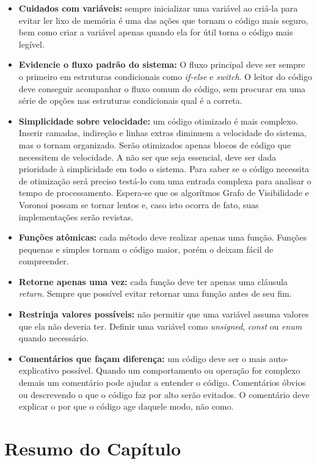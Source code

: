 \begin{itemize}
  \item \textbf{Cuidados com variáveis:} sempre inicializar uma variável ao criá-la para evitar ler lixo de memória é uma das ações que tornam o código mais seguro, bem como criar a variável apenas quando ela for útil torna o código mais legível.
  \item \textbf{Evidencie o fluxo padrão do sistema:} O fluxo principal deve ser sempre o primeiro em estruturas condicionais como \textit{if-else} e \textit{switch}. O leitor do código deve conseguir acompanhar o fluxo comum do código, sem procurar em uma série de opções nas estruturas condicionais qual é a correta.
  \item \textbf{Simplicidade sobre velocidade:} um código otimizado é mais complexo. Inserir camadas, indireção e linhas extras diminuem a velocidade do sistema, mas o tornam organizado. Serão otimizados apenas blocos de código que necessitem de velocidade. A não ser que seja essencial, deve ser dada prioridade à simplicidade em todo o sistema. Para saber se o código necessita de otimização será preciso testá-lo com uma entrada complexa para analisar o tempo de processamento. Espera-se que os algorítmos Grafo de Visibilidade e Voronoi possam se tornar lentos e, caso isto ocorra de fato, suas implementações serão revistas.
  \item \textbf{Funções atômicas:} cada método deve realizar apenas uma função. Funções pequenas e simples tornam o código maior, porém o deixam fácil de compreender.
  \item \textbf{Retorne apenas uma vez:} cada função deve ter apenas uma cláusula \textit{return}. Sempre que possível evitar retornar uma função antes de seu fim.
  \item \textbf{Restrinja valores possíveis:} não permitir que uma variável assuma valores que ela não deveria ter. Definir uma variável como \textit{unsigned}, \textit{const} ou \textit{enum} quando necessário.
  \item \textbf{Comentários que façam diferença:} um código deve ser o mais auto-explicativo possível. Quando um comportamento ou operação for complexo demais um comentário pode ajudar a entender o código. Comentários óbvios ou descrevendo o que o código faz por alto serão evitados. O comentário deve explicar o por que o código age daquele modo, não como.
\end{itemize} 

\section{Resumo do Capítulo}

